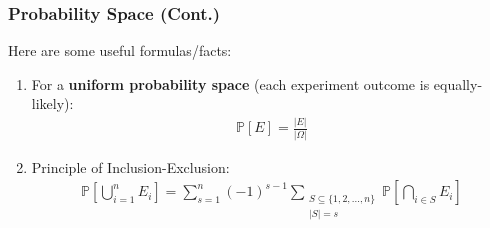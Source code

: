 \documentclass{beamer}
\begin{document}
\begin{frame}
    \frametitle{Probability Space (Cont.)}
    Here are some useful formulas/facts:
    \begin{enumerate}
        \item For a {\bf uniform probability space} (each experiment outcome is equally-likely): 
        \begin{gather*}
            \mathbb{P}[E]=\frac{|E|}{|\Omega|}
        \end{gather*}
        \item Principle of Inclusion-Exclusion:
        \begin{gather*}
            \mathbb{P}\left[\bigcup_{i=1}^n E_i\right]=\sum_{s=1}^n(-1)^{s-1}\sum_{\substack{S\subseteq\{1,2,...,n\}\\|S|=s}}\mathbb{P}\left[\bigcap_{i\in S}E_i\right]
        \end{gather*}
    \end{enumerate}
\end{frame}
\end{document}
